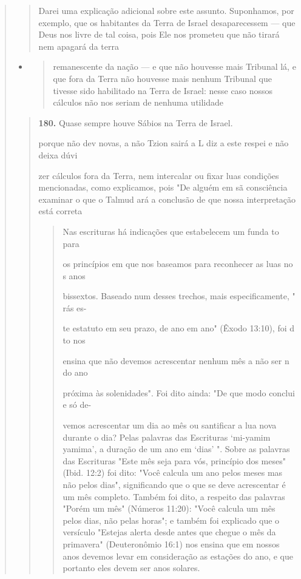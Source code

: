 \begin{quote}
\begin{quote}
Darei uma explicação adicional sobre este assunto. Suponhamos, por
exemplo, que os habitantes da Terra de Israel desaparecessem --- que
Deus nos livre de tal coisa, pois Ele nos prometeu que não tirará nem
apagará da terra
\end{quote}

\begin{itemize}
\item
 \begin{quote}
 remanescente da nação --- e que não houvesse mais Tribunal lá, e que
 fora da Terra não houvesse mais nenhum Tribunal que tivesse sido
 habilitado na Terra de Israel: nesse caso nossos cálculos não nos
 seriam de nenhuma utilidade
 \end{quote}
\end{itemize}

\begin{quote}
\textbf{180.} Quase sempre houve Sábios na Terra de Israel.


porque não dev novas, a não Tzion sairá a L diz a este respei e não
deixa dúvi

zer cálculos fora da Terra, nem intercalar ou fixar luas condições
mencionadas, como explicamos, pois "De alguém em sã consciência examinar
o que o Talmud ará a conclusão de que nossa interpretação está correta

\begin{quote}
Nas escrituras há indicações que estabelecem um funda to para

os princípios em que nos baseamos para reconhecer as luas no s anos

bissextos. Baseado num desses trechos, mais especificamente, " rás es-

te estatuto em seu prazo, de ano em ano" (Êxodo 13:10), foi d to nos

ensina que não devemos acrescentar nenhum mês a não ser n do ano

próxima às solenidades". Foi dito ainda: "De que modo conclui e só de-

vemos acrescentar um dia ao mês ou santificar a lua nova durante o dia?
Pelas palavras das Escrituras `mi-yamim yamima', a duração de um ano em
`dias' ". Sobre as palavras das Escrituras "Este mês seja para vós,
princípio dos meses" (Ibid. 12:2) foi dito: "Você calcula um ano pelos
meses mas não pelos dias", significando que o que se deve acrescentar é
um mês completo. Também foi dito, a respeito das palavras "Porém um mês"
(Números 11:20): "Você calcula um mês pelos dias, não pelas horas"; e
também foi explicado que o versículo "Estejas alerta desde antes que
chegue o mês da primavera" (Deuteronômio 16:1) nos ensina que em nossos
anos devemos levar em consideração as esta­ções do ano, e que portanto
eles devem ser anos solares.


\end{quote}
\end{quote}
\end{quote}
